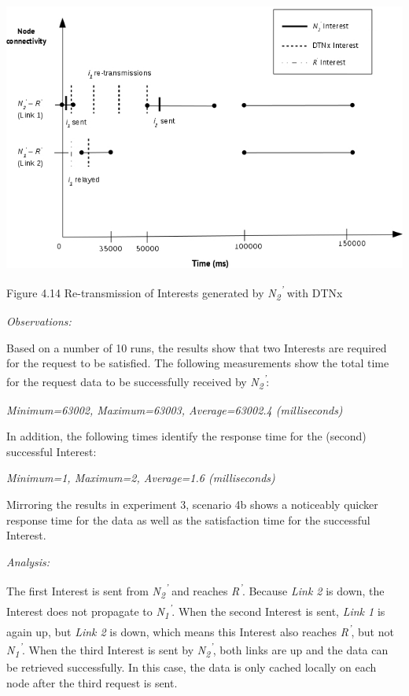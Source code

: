\documentclass[a4paper,12pt]{report}      %
\begin{document}
\noindent\includegraphics[scale=0.55]{exp4b_timediag.jpg}\newline
\begin{center}Figure 4.14 Re-transmission of Interests generated by \emph{N\textsubscript{2}\textsuperscript{'}} with DTNx\end{center} 

\vspace*{1\baselineskip}\noindent\emph{Observations:}

Based on a number of 10 runs, the results show that two Interests are required for the request to be
satisfied. The following measurements show the total time for the request data to be successfully
received by \emph{N\textsubscript{2}\textsuperscript{'}}:

\begin{center}\textsl{Minimum=63002, Maximum=63003, Average=63002.4 (milliseconds)}\end{center}

In addition, the following times identify the response time for the (second) successful Interest:

\begin{center}\textsl{Minimum=1, Maximum=2, Average=1.6 (milliseconds)}\end{center}

Mirroring the results in experiment 3, scenario 4b shows a noticeably quicker response time for the data as well as the satisfaction time for the successful Interest.

\vspace*{1\baselineskip}\noindent\emph{Analysis:}

The first Interest is sent from \emph{N\textsubscript{2}\textsuperscript{'}} and reaches \emph{R\textsuperscript{'}}. Because \emph{Link 2} is down, the Interest does not propagate to \emph{N\textsubscript{1}\textsuperscript{'}}. When the second Interest is sent, \emph{Link 1} is again up, but \emph{Link 2} is down, which means this Interest also reaches \emph{R\textsuperscript{'}}, but not \emph{N\textsubscript{1}\textsuperscript{'}}. When the third Interest is sent by \emph{N\textsubscript{2}\textsuperscript{'}}, both links are up and the data can be retrieved successfully. In this case, the data is only cached locally on each node after the third request is sent.
\end{document}
